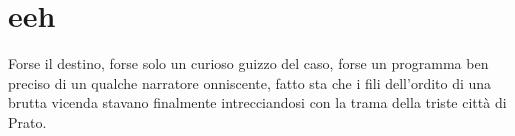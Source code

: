 \chapter{eeh}


Forse il destino, forse solo un curioso guizzo del caso, forse un programma ben preciso di un qualche narratore onniscente, fatto sta che i fili dell'ordito di una brutta vicenda stavano finalmente intrecciandosi con la trama della triste città di Prato.
